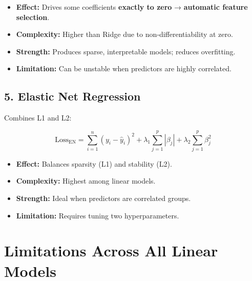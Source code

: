 \documentclass[
  english,
  letterpaper,
  DIV=11,
  numbers=noendperiod]{scrreprt}
\providecommand{\tightlist}{%
  \setlength{\itemsep}{0pt}\setlength{\parskip}{0pt}}
\begin{document}
\begin{itemize}
\tightlist
\item
  \textbf{Effect:} Drives some coefficients \textbf{exactly to zero} →
  \textbf{automatic feature selection}.\\
\item
  \textbf{Complexity:} Higher than Ridge due to non‑differentiability at
  zero.\\
\item
  \textbf{Strength:} Produces sparse, interpretable models; reduces
  overfitting.\\
\item
  \textbf{Limitation:} Can be unstable when predictors are highly
  correlated.
\end{itemize}

\subsection{\texorpdfstring{\textbf{5. Elastic Net
Regression}}{5. Elastic Net Regression}}\label{elastic-net-regression}

Combines L1 and L2:

\[
\text{Loss}_{\text{EN}} = \sum_{i=1}^{n} (y_i - \hat{y}_i)^2 
+ \lambda_1 \sum_{j=1}^{p} |\beta_j|
+ \lambda_2 \sum_{j=1}^{p} \beta_j^2
\]

\begin{itemize}
\tightlist
\item
  \textbf{Effect:} Balances sparsity (L1) and stability (L2).\\
\item
  \textbf{Complexity:} Highest among linear models.\\
\item
  \textbf{Strength:} Ideal when predictors are correlated groups.\\
\item
  \textbf{Limitation:} Requires tuning two hyperparameters.
\end{itemize}

\section{Limitations Across All Linear
Models}\label{limitations-across-all-linear-models}
\end{document}
